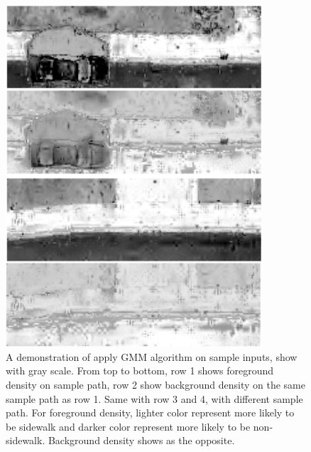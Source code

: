 \begin{figure}[H]
    \centering
    \includegraphics[width=0.85\textwidth]{Figures/GMM_needed.png}
    \caption[Density Background Subtraction]{A demonstration of apply \ac{GMM} algorithm on sample inputs, show with gray scale. From top to bottom, row 1 shows foreground density on sample path, row 2 show background density on the same sample path as row 1. Same with row 3 and 4, with different sample path. For foreground density, lighter color represent more likely to be sidewalk and darker color represent more likely to be non-sidewalk. Background density shows as the opposite.}
    \label{fig:gmm_sample_1}
\end{figure}



